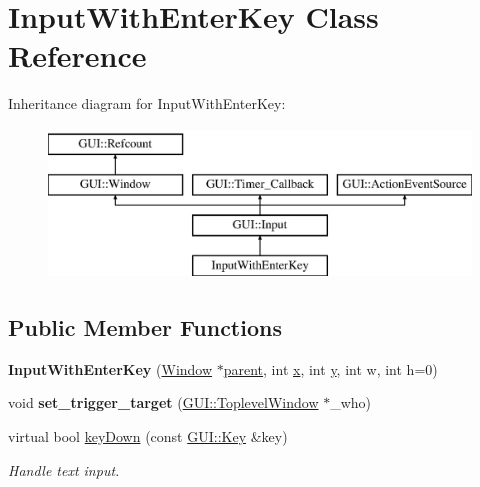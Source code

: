 \hypertarget{classInputWithEnterKey}{\section{Input\-With\-Enter\-Key Class Reference}
\label{classInputWithEnterKey}
}
Inheritance diagram for Input\-With\-Enter\-Key\-:\begin{figure}[H]
\begin{center}
\leavevmode
\includegraphics[height=4.000000cm]{classInputWithEnterKey}
\end{center}
\end{figure}
\subsection*{Public Member Functions}
\begin{DoxyCompactItemize}
\item 
\hypertarget{classInputWithEnterKey_a73f3a1afbbc586e9612b5930f9b6a21e}{{\bfseries Input\-With\-Enter\-Key} (\hyperlink{classGUI_1_1Window_ae828e9daa964dfc65a3550fb03117d30}{Window} $\ast$\hyperlink{classGUI_1_1Window_a2e593ff65e7702178d82fe9010a0b539}{parent}, int \hyperlink{classGUI_1_1Window_a6ca6a80ca00c9e1d8ceea8d3d99a657d}{x}, int \hyperlink{classGUI_1_1Window_a0ee8e923aff2c3661fc2e17656d37adf}{y}, int w, int h=0)}\label{classInputWithEnterKey_a73f3a1afbbc586e9612b5930f9b6a21e}

\item 
\hypertarget{classInputWithEnterKey_a6dfe84e2d82786b2b9d3530704bf4130}{void {\bfseries set\-\_\-trigger\-\_\-target} (\hyperlink{classGUI_1_1ToplevelWindow}{G\-U\-I\-::\-Toplevel\-Window} $\ast$\-\_\-who)}\label{classInputWithEnterKey_a6dfe84e2d82786b2b9d3530704bf4130}

\item 
\hypertarget{classInputWithEnterKey_af2cf7e73ba6a0ee935d3782d987d62c2}{virtual bool \hyperlink{classInputWithEnterKey_af2cf7e73ba6a0ee935d3782d987d62c2}{key\-Down} (const \hyperlink{classGUI_1_1Key}{G\-U\-I\-::\-Key} \&key)}\label{classInputWithEnterKey_af2cf7e73ba6a0ee935d3782d987d62c2}

\begin{DoxyCompactList}\small\item\em Handle text input. \end{DoxyCompactList}\end{DoxyCompactItemize}
